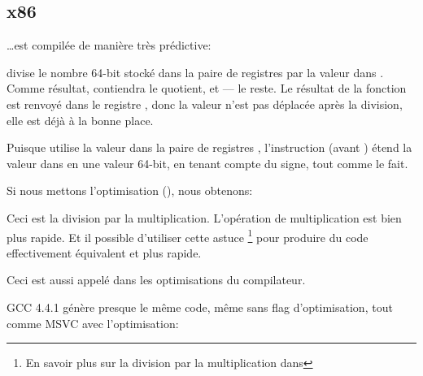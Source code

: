 ﻿\subsection{x86}

\dots est compilée de manière très prédictive:




\IDIV divise le nombre 64-bit stocké dans la paire de registres  par
la valeur dans \ECX.
Comme résultat, \EAX contiendra le \gls{quotient}, et \EDX --- le reste.
Le résultat de la fonction \ttf est renvoyé dans le registre \EAX, donc la valeur
n'est pas déplacée après la division, elle est déjà à la bonne place.

Puisque \IDIV utilise la valeur dans la paire de registres , l'instruction
 (avant \IDIV) étend la valeur dans \EAX en une valeur 64-bit, en tenant
compte du signe, tout comme \MOVSX le fait.

Si nous mettons l'optimisation (\Ox), nous obtenons:



Ceci est la division par la multiplication. L'opération de multiplication est bien
plus rapide.
Et il possible d'utiliser cette astuce
\footnote{En savoir plus sur la division par la multiplication dans }
pour produire du code effectivement équivalent et plus rapide.

Ceci est aussi appelé  dans les optimisations du compilateur.

GCC 4.4.1 génère presque le même code, même sans flag d'optimisation, tout comme
MSVC avec l'optimisation:


